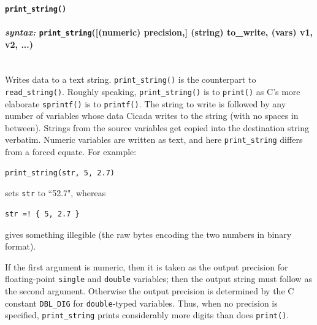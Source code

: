 \documentclass{article}
\newenvironment{code}{
       \begin{list}{}{
               \setlength{\leftmargin}{.4in}
               \setlength{\rightmargin}{0in}
               \setlength{\topsep}{.2in}
       }
       \small
       \item[] }
       { \end{list}   }
\begin{document}
 






\paragraph{\texttt{print\_string()}\\\\
\normalfont \emph{syntax: } \texttt{print\_string}([(numeric) precision,] (string) to\_write, (vars) v1, v2, ...)\\\\}
  

Writes data to a text string.  \texttt{print\_string()} is the counterpart to \texttt{read\_string()}.  Roughly speaking, \texttt{print\_string()} is to \texttt{print()} as C's more elaborate \texttt{sprintf()} is to \texttt{printf()}.  The string to write is followed by any number of variables whose data Cicada writes to the string (with no spaces in between).  Strings from the source variables get copied into the destination string verbatim.  Numeric variables are written as text, and here \texttt{print\_string} differs from a forced equate.  For example: 

\begin{code} \begin{verbatim}
print_string(str, 5, 2.7)
\end{verbatim} \end{code}

\noindent sets \texttt{str} to ``52.7", whereas

\begin{code} \begin{verbatim}
str =! { 5, 2.7 }
\end{verbatim} \end{code}

\noindent gives something illegible (the raw bytes encoding the two numbers in binary format).

If the first argument is numeric, then it is taken as the output precision for floating-point \texttt{single} and \texttt{double} variables; then the output string must follow as the second argument.  Otherwise the output precision is determined by the C constant \texttt{DBL\_DIG} for \texttt{double}-typed variables.  Thus, when no precision is specified, \texttt{print\_string} prints considerably more digits than does \texttt{print()}.\\
\end{document}
